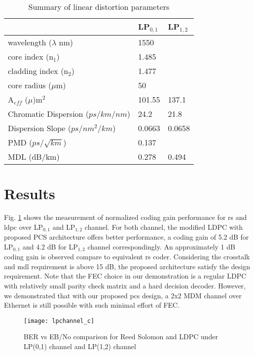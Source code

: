 \begin{table}[h]
\centering
\caption{Summary of linear distortion parameters}
\label{tab:sum}
\footnotesize
\begin{tabular}{|l|l|l|}
\hline
                                  & LP$_{0,1}$    & LP$_{1,2}$   \\ \hline
wavelength ($\lambda$ nm)         & \multicolumn{2}{l|}{1550} \\ \hline
core index (n$_1$)                & \multicolumn{2}{l|}{1.485}   \\ \hline
cladding index (n$_2$)            & \multicolumn{2}{l|}{1.477}   \\ \hline
core radius ($\mu$m)              & \multicolumn{2}{l|}{50}      \\ \hline
A$_{eff}$ ($\mu$)m$^2$            & 101.55        & 137.1        \\ \hline
Chromatic Dispersion ($ps/km/nm$) & 24.2          & 21.8         \\ \hline
Dispersion Slope ($ps/nm^2/km$)   & 0.0663        & 0.0658       \\ \hline
PMD ($ps/\sqrt{km}$)              & \multicolumn{2}{l|}{0.137}   \\ \hline
MDL  (dB/km)                      & 0.278         & 0.494        \\ \hline
\end{tabular}
\end{table}

\section{Results}
Fig. \ref{fig:ecc} shows the measurement of normalized coding gain performance for \ac{rs} and \ac{ldpc} over LP$_{0,1}$ and LP$_{1,2}$ channel. For both channel, the modified LDPC with proposed PCS architecture offers better performance, a coding gain of 5.2 dB for LP$_{0,1}$ and 4.2 dB for LP$_{1,2}$ channel correspondingly. An approximately 1 dB coding gain is observed compare to equivalent \ac{rs} coder. Considering the crosstalk and \ac{mdl} requirement is above 15 dB, the proposed architecture satisfy the design requirement.
Note that the FEC choice in our demonstration is a regular LDPC with relatively small parity check matrix and a hard decision decoder. However, we demonstrated that with our proposed \ac{pcs} design, a 2x2 MDM channel over Ethernet is still possible with such minimal effort of FEC. 


\begin{figure}[h]
  \centering
  \texttt{[image: lpchannel\_c]}
  \caption{BER vs EB/No comparison for Reed Solomon and LDPC under LP(0,1) channel and LP(1,2) channel}
  \label{fig:ecc}
\end{figure}



